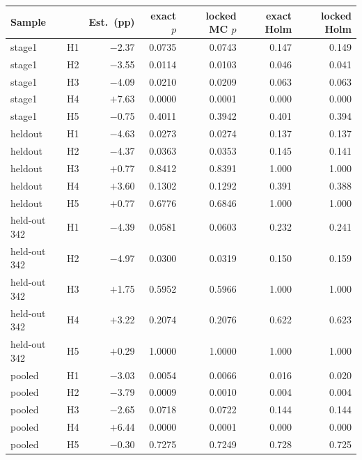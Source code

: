 \begin{tabular}{llrrrrr}
\toprule
Sample & & Est.\ (pp) & exact $p$ & locked MC $p$ & exact Holm & locked Holm \\
\midrule
stage1 & H1 & $-$2.37 & 0.0735 & 0.0743 & 0.147 & 0.149 \\
stage1 & H2 & $-$3.55 & 0.0114 & 0.0103 & 0.046 & 0.041 \\
stage1 & H3 & $-$4.09 & 0.0210 & 0.0209 & 0.063 & 0.063 \\
stage1 & H4 & $+$7.63 & 0.0000 & 0.0001 & 0.000 & 0.000 \\
stage1 & H5 & $-$0.75 & 0.4011 & 0.3942 & 0.401 & 0.394 \\
heldout & H1 & $-$4.63 & 0.0273 & 0.0274 & 0.137 & 0.137 \\
heldout & H2 & $-$4.37 & 0.0363 & 0.0353 & 0.145 & 0.141 \\
heldout & H3 & $+$0.77 & 0.8412 & 0.8391 & 1.000 & 1.000 \\
heldout & H4 & $+$3.60 & 0.1302 & 0.1292 & 0.391 & 0.388 \\
heldout & H5 & $+$0.77 & 0.6776 & 0.6846 & 1.000 & 1.000 \\
held-out 342 & H1 & $-$4.39 & 0.0581 & 0.0603 & 0.232 & 0.241 \\
held-out 342 & H2 & $-$4.97 & 0.0300 & 0.0319 & 0.150 & 0.159 \\
held-out 342 & H3 & $+$1.75 & 0.5952 & 0.5966 & 1.000 & 1.000 \\
held-out 342 & H4 & $+$3.22 & 0.2074 & 0.2076 & 0.622 & 0.623 \\
held-out 342 & H5 & $+$0.29 & 1.0000 & 1.0000 & 1.000 & 1.000 \\
pooled & H1 & $-$3.03 & 0.0054 & 0.0066 & 0.016 & 0.020 \\
pooled & H2 & $-$3.79 & 0.0009 & 0.0010 & 0.004 & 0.004 \\
pooled & H3 & $-$2.65 & 0.0718 & 0.0722 & 0.144 & 0.144 \\
pooled & H4 & $+$6.44 & 0.0000 & 0.0001 & 0.000 & 0.000 \\
pooled & H5 & $-$0.30 & 0.7275 & 0.7249 & 0.728 & 0.725 \\
\bottomrule
\end{tabular}
